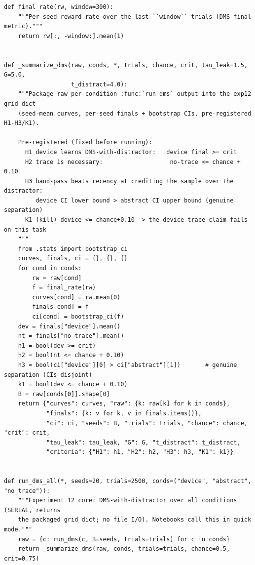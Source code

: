 \begin{lstlisting}[caption={mrl\_trace/deep.py},label={lst:siox-src-deep}]
def final_rate(rw, window=300):
    """Per-seed reward rate over the last ``window`` trials (DMS final metric)."""
    return rw[:, -window:].mean(1)


def _summarize_dms(raw, conds, *, trials, chance, crit, tau_leak=1.5, G=5.0,
                   t_distract=4.0):
    """Package raw per-condition :func:`run_dms` output into the exp12 grid dict
    (seed-mean curves, per-seed finals + bootstrap CIs, pre-registered H1-H3/K1).

    Pre-registered (fixed before running):
      H1 device learns DMS-with-distractor:   device final >= crit
      H2 trace is necessary:                   no-trace <= chance + 0.10
      H3 band-pass beats recency at crediting the sample over the distractor:
         device CI lower bound > abstract CI upper bound (genuine separation)
      K1 (kill) device <= chance+0.10 -> the device-trace claim fails on this task
    """
    from .stats import bootstrap_ci
    curves, finals, ci = {}, {}, {}
    for cond in conds:
        rw = raw[cond]
        f = final_rate(rw)
        curves[cond] = rw.mean(0)
        finals[cond] = f
        ci[cond] = bootstrap_ci(f)
    dev = finals["device"].mean()
    nt = finals["no_trace"].mean()
    h1 = bool(dev >= crit)
    h2 = bool(nt <= chance + 0.10)
    h3 = bool(ci["device"][0] > ci["abstract"][1])       # genuine separation (CIs disjoint)
    k1 = bool(dev <= chance + 0.10)
    B = raw[conds[0]].shape[0]
    return {"curves": curves, "raw": {k: raw[k] for k in conds},
            "finals": {k: v for k, v in finals.items()},
            "ci": ci, "seeds": B, "trials": trials, "chance": chance, "crit": crit,
            "tau_leak": tau_leak, "G": G, "t_distract": t_distract,
            "criteria": {"H1": h1, "H2": h2, "H3": h3, "K1": k1}}


def run_dms_all(*, seeds=20, trials=2500, conds=("device", "abstract", "no_trace")):
    """Experiment 12 core: DMS-with-distractor over all conditions (SERIAL, returns
    the packaged grid dict; no file I/O). Notebooks call this in quick mode."""
    raw = {c: run_dms(c, B=seeds, trials=trials) for c in conds}
    return _summarize_dms(raw, conds, trials=trials, chance=0.5, crit=0.75)



\end{lstlisting}
